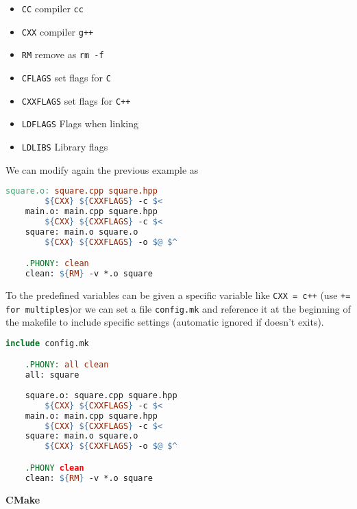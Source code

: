 \documentclass[fontsize=8pt, a4paper, landscape, fleqn]{scrartcl}
\renewcommand{\section}[1]{%
    \noindent\colorbox{sectioncolor}{%
        \parbox{\dimexpr\columnwidth-2\fboxsep}{\color{white}\textbf{#1}}}%
    \vspace{0.5mm}%
}
\begin{document}
\begin{multicols*}{3}[\raggedcolumns]
    \begin{multicols}{2}
    \begin{itemize}
        \item \lstinline{CC} compiler \lstinline{cc}
        \item \lstinline{CXX} compiler \lstinline{g++}
        \item \lstinline{RM} remove as \lstinline{rm -f}
        \item \lstinline{CFLAGS} set flags for \lstinline{C}
        \item \lstinline{CXXFLAGS} set flags for \lstinline{C++}
        \item \lstinline{LDFLAGS} Flags when linking
        \item \lstinline{LDLIBS} Library flags
    \end{itemize}
    \end{multicols}

    We can modify again the previous example as

    \begin{lstlisting}[language=make, breaklines]
    square.o: square.cpp square.hpp
        ${CXX} ${CXXFLAGS} -c $<
    main.o: main.cpp square.hpp
        ${CXX} ${CXXFLAGS} -c $<        
    square: main.o square.o
        ${CXX} ${CXXFLAGS} -o $@ $^

    .PHONY: clean
    clean: ${RM} -v *.o square \end{lstlisting}

    To the predefined variables can be given a specific variable like \lstinline{CXX = c++} (use \lstinline{+= for multiples})or we can set a file \lstinline{config.mk} and reference it at the beginning of the makefile to include specific settings (automatic ignored if doesn't exits).

    \begin{lstlisting}[language=make, breaklines]
    include config.mk

    .PHONY: all clean
    all: square
    
    square.o: square.cpp square.hpp
        ${CXX} ${CXXFLAGS} -c $<
    main.o: main.cpp square.hpp
        ${CXX} ${CXXFLAGS} -c $<        
    square: main.o square.o
        ${CXX} ${CXXFLAGS} -o $@ $^

    .PHONY clean
    clean: ${RM} -v *.o square
    \end{lstlisting}
    
	\section{CMake}
 

\end{multicols*}
\end{document}
